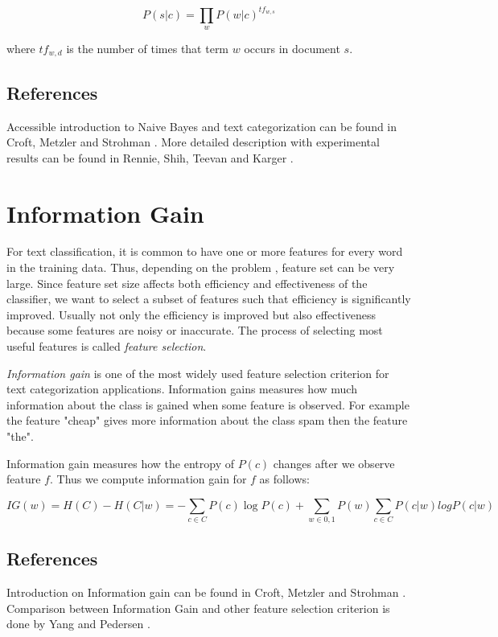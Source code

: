 \documentclass{report}
\begin{document}
\[
P(s|c) = \prod_{w} P(w|c)^{tf_{w,s}}
\]

where $tf_{w,d}$ is the number of times that term $w$ occurs in document $s$.

\subsection{References}

Accessible introduction to Naive Bayes and text categorization can be found in Croft, Metzler and Strohman \cite{Croft:2010:SEI}. More detailed description with experimental results can be found in Rennie, Shih, Teevan and Karger \cite{Rennie03}.

\section{Information Gain}
\label{featureselection}

For text classification, it is common to have one or more features for every word in the training data. Thus, depending on the problem , feature set can be very large. Since feature set size affects both efficiency and effectiveness of the classifier, we want to select a subset of features such that efficiency is significantly improved. Usually not only the efficiency is improved but also effectiveness because some features are noisy or inaccurate. The process of selecting most useful features is called \textit{feature selection}.

\textit{Information gain} is one of the most widely used feature selection criterion for text categorization applications. Information gains measures how much information about the class is gained when some feature is observed. For example the feature "cheap" gives more information about the class spam then the feature "the". 

Information gain measures how the entropy of $P(c)$ changes after we observe feature $f$. Thus we compute information gain for $f$ as follows:

\[
IG(w) = H(C) - H(C|w) = - \sum_{c \in C} P(c) \log P(c) + \sum_{w \in {0,1}} P(w) \sum_{c \in C} P(c|w) log P(c|w)
\]

\subsection{References}

Introduction on Information gain can be found in Croft, Metzler and Strohman \cite{Croft:2010:SEI}. Comparison between Information Gain and other feature selection criterion is done by  Yang and Pedersen \cite{yang97}.
\end{document}
